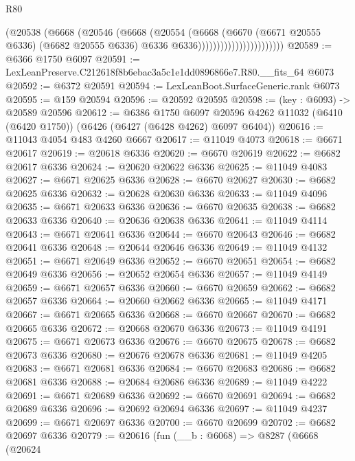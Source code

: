 \begin{lexlean}{R80}
\begin{coremodule}
                                    (@20538
                                      (@6668
                                        (@20546
                                          (@6668
                                            (@20554
                                              (@6668
                                                (@6670
                                                  (@6671 @20555 @6336)
                                                  (@6682 @20555 @6336)
                                                  @6336
                                                  @6336)))))))))))))))))))))))
@20589 := @6366 @1750 @6097
@20591 := LexLeanPreserve.C212618f8b6ebac3a5c1e1dd0896866e7.R80.__fits_64 @6073
@20592 := @6372 @20591
@20594 := LexLeanBoot.SurfaceGeneric.rank @6073
@20595 := @159 @20594
@20596 := @20592 @20595
@20598 := (key : @6093) -> @20589 @20596
@20612 := @6386
    @1750
    @6097
    @20596
    @4262
    @11032
    (@6410 (@6420 @1750))
    (@6426 (@6427 (@6428 @4262) @6097 @6404))
@20616 := @11043 @4054 @483 @4260 @6667
@20617 := @11049 @4073
@20618 := @6671 @20617
@20619 := @20618 @6336
@20620 := @6670 @20619
@20622 := @6682 @20617 @6336
@20624 := @20620 @20622 @6336
@20625 := @11049 @4083
@20627 := @6671 @20625 @6336
@20628 := @6670 @20627
@20630 := @6682 @20625 @6336
@20632 := @20628 @20630 @6336
@20633 := @11049 @4096
@20635 := @6671 @20633 @6336
@20636 := @6670 @20635
@20638 := @6682 @20633 @6336
@20640 := @20636 @20638 @6336
@20641 := @11049 @4114
@20643 := @6671 @20641 @6336
@20644 := @6670 @20643
@20646 := @6682 @20641 @6336
@20648 := @20644 @20646 @6336
@20649 := @11049 @4132
@20651 := @6671 @20649 @6336
@20652 := @6670 @20651
@20654 := @6682 @20649 @6336
@20656 := @20652 @20654 @6336
@20657 := @11049 @4149
@20659 := @6671 @20657 @6336
@20660 := @6670 @20659
@20662 := @6682 @20657 @6336
@20664 := @20660 @20662 @6336
@20665 := @11049 @4171
@20667 := @6671 @20665 @6336
@20668 := @6670 @20667
@20670 := @6682 @20665 @6336
@20672 := @20668 @20670 @6336
@20673 := @11049 @4191
@20675 := @6671 @20673 @6336
@20676 := @6670 @20675
@20678 := @6682 @20673 @6336
@20680 := @20676 @20678 @6336
@20681 := @11049 @4205
@20683 := @6671 @20681 @6336
@20684 := @6670 @20683
@20686 := @6682 @20681 @6336
@20688 := @20684 @20686 @6336
@20689 := @11049 @4222
@20691 := @6671 @20689 @6336
@20692 := @6670 @20691
@20694 := @6682 @20689 @6336
@20696 := @20692 @20694 @6336
@20697 := @11049 @4237
@20699 := @6671 @20697 @6336
@20700 := @6670 @20699
@20702 := @6682 @20697 @6336
@20779 := @20616
    (fun (__b : @6068) =>
    @8287
      (@6668
        (@20624

\end{coremodule}
\end{lexlean}
